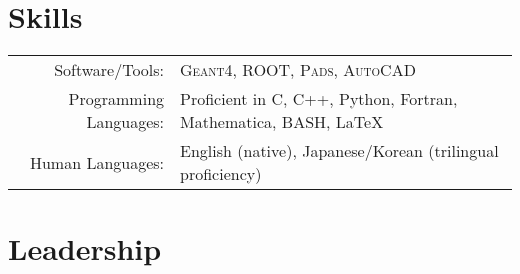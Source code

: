 \documentclass[10pt]{article} %
\begin{document}

\section{Skills}

\noindent\begin{tabularx}{\linewidth}{@{}rl}
	Software/Tools: & \textsc{Geant4}, \textsc{ROOT}, \textsc{Pads}, \textsc{AutoCAD}\\
	Programming Languages: & Proficient in C, C++, Python, Fortran, Mathematica, BASH, LaTeX\\
	Human Languages: & English (native), Japanese/Korean (trilingual proficiency)\\
\end{tabularx}


\section{Leadership}
\end{document}
